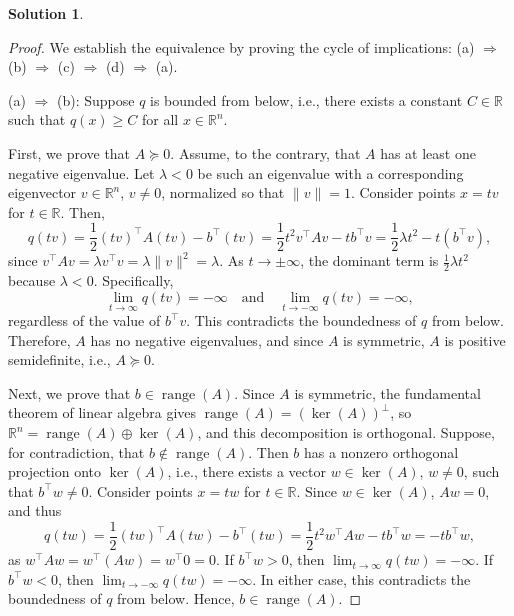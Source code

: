 \documentclass[12pt]{article}
\theoremstyle{definition}
\newtheorem*{solution}{\normalfont\textbf{Solution}}
\DeclareMathOperator{\range}{range}
\begin{document}
\begin{enumerate}[leftmargin=*]
        \begin{solution}
            \begin{proof}
            We establish the equivalence by proving the cycle of implications: (a) \(\Rightarrow\) (b) \(\Rightarrow\) (c) \(\Rightarrow\) (d) \(\Rightarrow\) (a).

            \noindent
            (a) \(\Rightarrow\) (b): Suppose \( q \) is bounded from below, i.e., there exists a constant \( C \in \mathbb{R} \) such that \( q(x) \geq C \) for all \( x \in \mathbb{R}^n \).

            First, we prove that \( A \succeq 0 \). Assume, to the contrary, that \( A \) has at least one negative eigenvalue. Let \( \lambda < 0 \) be such an eigenvalue with a corresponding eigenvector \( v \in \mathbb{R}^n \), \( v \neq 0 \), normalized so that \( \|v\| = 1 \). Consider points \( x = t v \) for \( t \in \mathbb{R} \). Then,
            \[
            q(t v) = \frac{1}{2} (t v)^\top A (t v) - b^\top (t v) = \frac{1}{2} t^2 v^\top A v - t b^\top v = \frac{1}{2} \lambda t^2 - t (b^\top v),
            \]
            since \( v^\top A v = \lambda v^\top v = \lambda \|v\|^2 = \lambda \). As \( t \to \pm\infty \), the dominant term is \( \frac{1}{2} \lambda t^2 \) because \( \lambda < 0 \). Specifically,
            \[
            \lim_{t \to \infty} q(t v) = -\infty \quad \text{and} \quad \lim_{t \to -\infty} q(t v) = -\infty,
            \]
            regardless of the value of \( b^\top v \). This contradicts the boundedness of \( q \) from below. Therefore, \( A \) has no negative eigenvalues, and since \( A \) is symmetric, \( A \) is positive semidefinite, i.e., \( A \succeq 0 \).

            Next, we prove that \( b \in \range(A) \). Since \( A \) is symmetric, the fundamental theorem of linear algebra gives \( \range(A) = (\ker(A))^\perp \), so \( \mathbb{R}^n = \range(A) \oplus \ker(A) \), and this decomposition is orthogonal. Suppose, for contradiction, that \( b \notin \range(A) \). Then \( b \) has a nonzero orthogonal projection onto \( \ker(A) \), i.e., there exists a vector \( w \in \ker(A) \), \( w \neq 0 \), such that \( b^\top w \neq 0 \). Consider points \( x = t w \) for \( t \in \mathbb{R} \). Since \( w \in \ker(A) \), \( A w = 0 \), and thus
            \[
            q(t w) = \frac{1}{2} (t w)^\top A (t w) - b^\top (t w) = \frac{1}{2} t^2 w^\top A w - t b^\top w = -t b^\top w,
            \]
            as \( w^\top A w = w^\top (A w) = w^\top 0 = 0 \). If \( b^\top w > 0 \), then \( \lim_{t \to \infty} q(t w) = -\infty \). If \( b^\top w < 0 \), then \( \lim_{t \to -\infty} q(t w) = -\infty \). In either case, this contradicts the boundedness of \( q \) from below. Hence, \( b \in \range(A) \).


\end{proof}
\end{solution}
\end{enumerate}
\end{document}
